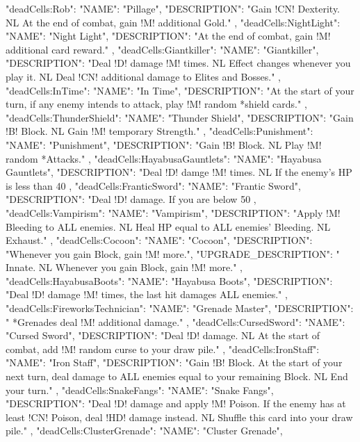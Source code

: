 {
  "deadCells:Rob": {
    "NAME": "Pillage",
    "DESCRIPTION": "Gain !CN! Dexterity. NL At the end of combat, gain !M! additional Gold."
  },
  "deadCells:NightLight": {
    "NAME": "Night Light",
    "DESCRIPTION": "At the end of combat, gain !M! additional card reward."
  },
  "deadCells:Giantkiller": {
    "NAME": "Giantkiller",
    "DESCRIPTION": "Deal !D! damage !M! times. NL Effect changes whenever you play it. NL Deal !CN! additional damage to Elites and Bosses."
  },
  "deadCells:InTime": {
    "NAME": "In Time",
    "DESCRIPTION": "At the start of your turn, if any enemy intends to attack, play !M! random *shield cards."
  },
  "deadCells:ThunderShield": {
    "NAME": "Thunder Shield",
    "DESCRIPTION": "Gain !B! Block. NL Gain !M! temporary Strength."
  },
  "deadCells:Punishment": {
    "NAME": "Punishment",
    "DESCRIPTION": "Gain !B! Block. NL Play !M! random *Attacks."
  },
  "deadCells:HayabusaGauntlets": {
    "NAME": "Hayabusa Gauntlets",
    "DESCRIPTION": "Deal !D! damge !M! times. NL If the enemy's HP is less than 40%
  },
  "deadCells:FranticSword": {
    "NAME": "Frantic Sword",
    "DESCRIPTION": "Deal !D! damage. If you are below 50%
  },
  "deadCells:Vampirism": {
    "NAME": "Vampirism",
    "DESCRIPTION": "Apply !M! Bleeding to ALL enemies. NL Heal HP equal to ALL enemies' Bleeding. NL Exhaust."
  },
  "deadCells:Cocoon": {
    "NAME": "Cocoon",
    "DESCRIPTION": "Whenever you gain Block, gain !M! more.",
    "UPGRADE_DESCRIPTION": " Innate. NL Whenever you gain Block, gain !M! more."
  },
  "deadCells:HayabusaBoots": {
    "NAME": "Hayabusa Boots",
    "DESCRIPTION": "Deal !D! damage !M! times, the last hit damages ALL enemies."
  },
  "deadCells:FireworksTechnician": {
    "NAME": "Grenade Master",
    "DESCRIPTION": " *Grenades deal !M! additional damage."
  },
  "deadCells:CursedSword": {
    "NAME": "Cursed Sword",
    "DESCRIPTION": "Deal !D! damage. NL At the start of combat, add !M! random curse to your draw pile."
  },
  "deadCells:IronStaff": {
    "NAME": "Iron Staff",
    "DESCRIPTION": "Gain !B! Block. At the start of your next turn, deal damage to ALL enemies equal to your remaining Block. NL End your turn."
  },
  "deadCells:SnakeFangs": {
    "NAME": "Snake Fangs",
    "DESCRIPTION": "Deal !D! damage and apply !M! Poison. If the enemy has at least !CN! Poison, deal !HD! damage instead. NL Shuffle this card into your draw pile."
  },
  "deadCells:ClusterGrenade": {
    "NAME": "Cluster Grenade",
}}
